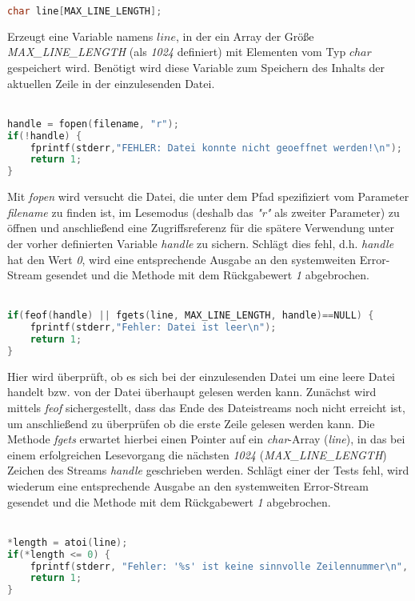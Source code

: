 \documentclass[11pt]{scrartcl}
\begin{document}
\begin{lstlisting}[language=C]
char line[MAX_LINE_LENGTH];
\end{lstlisting}
Erzeugt eine Variable namens \emph{$line$}, in der ein Array der Größe \emph{MAX\_LINE\_LENGTH} (als \emph{1024} definiert) mit Elementen vom Typ \emph{$char$} gespeichert wird. Benötigt wird diese Variable zum Speichern des Inhalts der aktuellen Zeile in der einzulesenden Datei.
\\\\
\begin{lstlisting}[language=C]
handle = fopen(filename, "r");
if(!handle) {
	fprintf(stderr,"FEHLER: Datei konnte nicht geoeffnet werden!\n");
	return 1; 
}
\end{lstlisting}
Mit \emph{fopen} wird versucht die Datei, die unter dem Pfad spezifiziert vom Parameter \emph{filename} zu finden ist, im Lesemodus (deshalb das \emph{"r"} als zweiter Parameter) zu öffnen und anschließend eine Zugriffsreferenz für die spätere Verwendung unter der vorher definierten Variable \emph{handle} zu sichern. Schlägt dies fehl, d.h. \emph{handle} hat den Wert \emph{0}, wird eine entsprechende Ausgabe an den systemweiten Error-Stream gesendet und die Methode mit dem Rückgabewert \emph{1} abgebrochen.
\\\\
\begin{lstlisting}[language=C]
if(feof(handle) || fgets(line, MAX_LINE_LENGTH, handle)==NULL) {
	fprintf(stderr,"Fehler: Datei ist leer\n");
	return 1;
}
\end{lstlisting}
Hier wird überprüft, ob es sich bei der einzulesenden Datei um eine leere Datei handelt bzw. von der Datei überhaupt gelesen werden kann. Zunächst wird mittels \emph{feof} sichergestellt, dass das Ende des Dateistreams noch nicht erreicht ist, um anschließend zu überprüfen ob die erste Zeile gelesen werden kann. Die Methode \emph{fgets} erwartet hierbei einen Pointer auf ein \emph{char}-Array (\emph{line}), in das bei einem erfolgreichen Lesevorgang die nächsten \emph{1024} (\emph{MAX\_LINE\_LENGTH}) Zeichen des Streams \emph{handle} geschrieben werden. Schlägt einer der Tests fehl, wird wiederum eine entsprechende Ausgabe an den systemweiten Error-Stream gesendet und die Methode mit dem Rückgabewert \emph{1} abgebrochen.
\\\\
\begin{lstlisting}[language=C]
*length = atoi(line);
if(*length <= 0) {
	fprintf(stderr, "Fehler: '%s' ist keine sinnvolle Zeilennummer\n", line);
	return 1;
}
\end{lstlisting}
\end{document}
